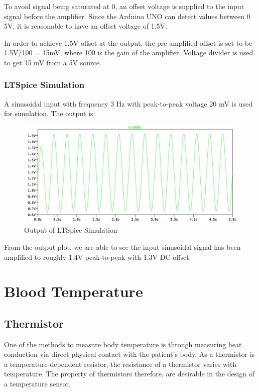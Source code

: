 To avoid signal being saturated at 0, an offset voltage is supplied to the input signal before the amplifier. Since the Arduino UNO can detect values between 0 ~ 5V, it is reasonable to have an offset voltage of 1.5V. 

In order to achieve 1.5V offset at the output, the pre-amplified offset is set to be 1.5V/100 = 15mV, where 100 is the gain of the amplifier. Voltage divider is used to get 15 mV from a 5V source.

\subsubsection{LTSpice Simulation}

A sinusoidal input with frequency 3 Hz with peak-to-peak voltage 20 mV is used for simulation. The output is:

\begin{figure}[H]
	\centering
	\includegraphics[width=0.7\linewidth]{georgepic7.jpg}
	\caption{Output of LTSpice Simulation}
\end{figure}

From the output plot, we are able to see the input sinusoidal signal has been amplified to roughly 1.4V peak-to-peak with 1.3V DC-offset.







\section{Blood Temperature}

\subsection{Thermistor}
\label{thermistor}

One of the methods to measure body temperature is through measuring heat conduction via direct physical contact with the patient's body. As a thermistor is a temperature-dependent resistor, the resistance of a thermistor varies with temperature. The property of thermistors therefore, are desirable in the design of a temperature sensor. 


